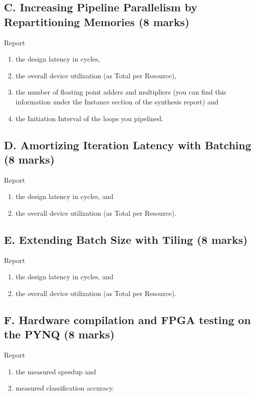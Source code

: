 \subsection{C. Increasing Pipeline Parallelism by Repartitioning Memories (8 marks)}

Report
\begin{enumerate}
    \item the design latency in cycles,
    \item the overall device utilization (as Total per Resource),
    \item the number of floating point adders and multipliers (you can find this information under the Instance section of the synthesis report) and
    \item the Initiation Interval of the loops you pipelined.
\end{enumerate}

\subsection{D. Amortizing Iteration Latency with Batching (8 marks)}

Report \begin{enumerate}
    \item the design latency in cycles, and
    \item the overall device utilization (as Total per Resource).
\end{enumerate}

\subsection{E. Extending Batch Size with Tiling (8 marks)}

Report \begin{enumerate}
    \item the design latency in cycles, and
    \item the overall device utilization (as Total per Resource).
\end{enumerate}

\subsection{F. Hardware compilation and FPGA testing on the PYNQ (8 marks)}

Report
\begin{enumerate}
    \item the measured speedup and
    \item measured classification accuracy.
\end{enumerate}

